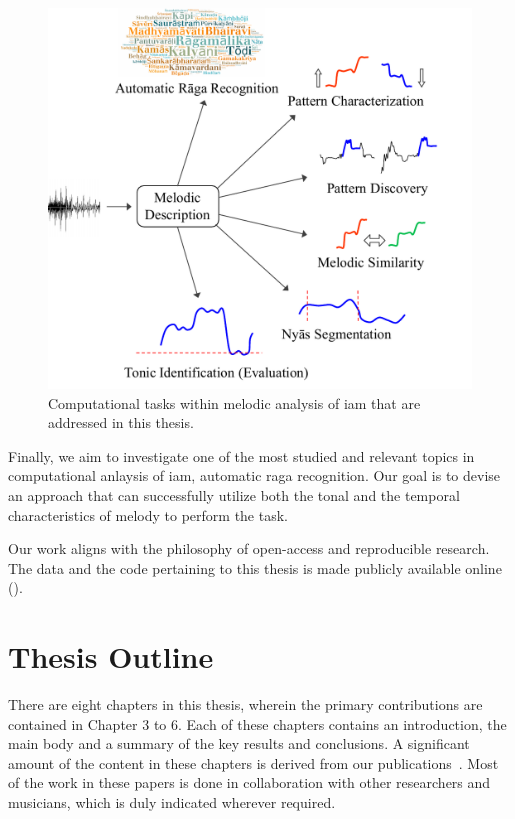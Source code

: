 \begin{figure}
	\begin{center}
		\includegraphics[width=\figSizeSeventyFive]{ch01_introduction/figures/tasks.pdf}
	\end{center}
	\caption{Computational tasks within melodic analysis of \gls{iam} that are addressed in this thesis.}
	\label{fig:tasks}
\end{figure}

Finally, we aim to investigate one of the most studied and relevant topics in computational anlaysis of \gls{iam}, automatic \gls{raga} recognition. Our goal is to devise an approach that can successfully utilize both the tonal and the temporal characteristics of melody to perform the task. 

Our work aligns with the philosophy of open-access and reproducible research. The data and the code pertaining to this thesis is made publicly available online (). 

\section{Thesis Outline}
\label{sec:intro_thesis_outline}

There are eight chapters in this thesis, wherein the primary contributions are contained in Chapter 3 to 6. Each of these chapters contains an introduction, the main body and a summary of the key results and conclusions. A significant amount of the content in these chapters is derived from our publications~\cite{Gulati2014Tonic,gulati2014Landmark,gulati_SITIS_2014,gulati_ICASSP2015,gulati_ISMIR_2015,gulati_communities_2016,gulatiphrase_2016,gulati_tdms_2016}. Most of the work in these papers is done in collaboration with other researchers and musicians, which is duly indicated wherever required. 

